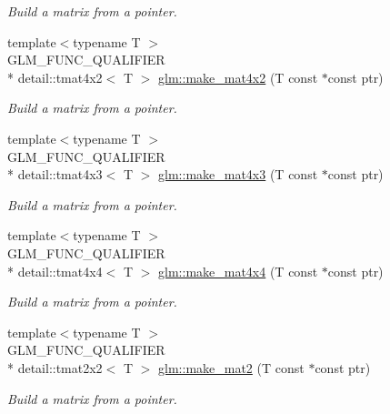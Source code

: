 \begin{DoxyCompactItemize}
\begin{DoxyCompactList}\small\item\em Build a matrix from a pointer. \end{DoxyCompactList}\item 
{\footnotesize template$<$typename T $>$ }\\G\-L\-M\-\_\-\-F\-U\-N\-C\-\_\-\-Q\-U\-A\-L\-I\-F\-I\-E\-R \\*
detail\-::tmat4x2$<$ T $>$ \hyperlink{group__gtc__type__ptr_ga3717ecbb38c8a24043ee17bdff94bca5}{glm\-::make\-\_\-mat4x2} (T const $\ast$const ptr)
\begin{DoxyCompactList}\small\item\em Build a matrix from a pointer. \end{DoxyCompactList}\item 
{\footnotesize template$<$typename T $>$ }\\G\-L\-M\-\_\-\-F\-U\-N\-C\-\_\-\-Q\-U\-A\-L\-I\-F\-I\-E\-R \\*
detail\-::tmat4x3$<$ T $>$ \hyperlink{group__gtc__type__ptr_gae91cc925c4154c5fe4ef1fc7da96a9a8}{glm\-::make\-\_\-mat4x3} (T const $\ast$const ptr)
\begin{DoxyCompactList}\small\item\em Build a matrix from a pointer. \end{DoxyCompactList}\item 
{\footnotesize template$<$typename T $>$ }\\G\-L\-M\-\_\-\-F\-U\-N\-C\-\_\-\-Q\-U\-A\-L\-I\-F\-I\-E\-R \\*
detail\-::tmat4x4$<$ T $>$ \hyperlink{group__gtc__type__ptr_gaa287485a3978d319e60a1cadd8a1c139}{glm\-::make\-\_\-mat4x4} (T const $\ast$const ptr)
\begin{DoxyCompactList}\small\item\em Build a matrix from a pointer. \end{DoxyCompactList}\item 
{\footnotesize template$<$typename T $>$ }\\G\-L\-M\-\_\-\-F\-U\-N\-C\-\_\-\-Q\-U\-A\-L\-I\-F\-I\-E\-R \\*
detail\-::tmat2x2$<$ T $>$ \hyperlink{group__gtc__type__ptr_gafd896ef261762a6ab412b61181d5ecae}{glm\-::make\-\_\-mat2} (T const $\ast$const ptr)
\begin{DoxyCompactList}\small\item\em Build a matrix from a pointer. \end{DoxyCompactList}\item 

\end{DoxyCompactItemize}
